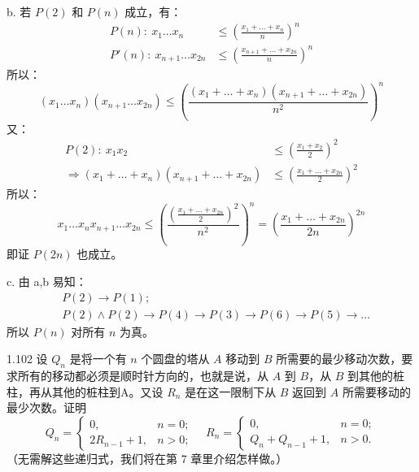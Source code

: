 b. 若 \( P(2) \) 和 \( P(n) \) 成立，有：
\begin{align*}
  P(n): \ x_1 \dots x_n &\le (\frac{x_1 + \dots + x_n}{n})^n \\
  P'(n): \ x_{n+1} \dots x_{2n} &\le (\frac{x_{n+1} + \dots + x_{2n}}{n})^n
\end{align*}
所以：
\begin{equation*}
  (x_1 \dots x_n)(x_{n+1} \dots x_{2n}) \le (\frac{(x_1 + \dots + x_n)(x_{n+1} + \dots + x_{2n})}{n^2})^n
\end{equation*}
又：
\begin{align*}
  P(2): \ x_1 x_2 &\le (\frac{x_1 + x_2}{2})^2 \\
  \Rightarrow (x_1 + \dots + x_n)(x_{n+1} + \dots + x_{2n}) &\le (\frac{x_1 + \dots + x_{2n}}{2})^2
\end{align*}
所以：
\begin{equation*}
  x_1 \dots x_n x_{n+1} \dots x_{2n} \le(\frac{(\frac{x_1 + \dots + x_{2n}}{2})^2}{n^2})^n =(\frac{x_1 + \dots + x_{2n}}{2n})^{2n}
\end{equation*}
即证 \( P(2n) \) 也成立。

c. 由 a,b 易知：
\begin{align*}
  &P(2) \rightarrow P(1); \\
  &P(2) \wedge P(2) \rightarrow P(4) \rightarrow P(3) \rightarrow P(6) \rightarrow P(5) \rightarrow \dots
\end{align*}
所以 \( P(n) \) 对所有 \( n \) 为真。

\begin{problem}{1.10}{2}
  设 \( Q_n \) 是将一个有 \( n \) 个圆盘的塔从 \( A \) 移动到 \( B \) 所需要的最少移动次数，要求所有的移动都必须是顺时针方向的，也就是说，从 \( A \) 到 \( B \)，从 \( B \) 到其他的桩柱，再从其他的桩柱到A。又设 \( R_n \) 是在这一限制下从 \( B \) 返回到 \( A \) 所需要移动的最少次数。证明
  \[
    Q_n =
    \begin{cases}
      0, & n = 0; \\
      2R_{n-1} + 1, & n > 0;
    \end{cases} \quad
    R_n =
    \begin{cases}
      0, & n = 0; \\
      Q_n + Q_{n-1} + 1, & n > 0.
    \end{cases}
  \]
  （无需解这些递归式，我们将在第 7 章里介绍怎样做。）
\end{problem}

